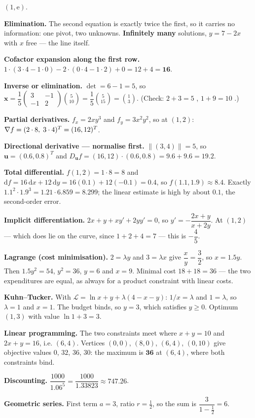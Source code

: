 \begin{solutions}
        $(1,\mathrm{e})$.
  \item \textbf{Elimination.} The second equation is exactly twice the
        first, so it carries no information: one pivot, two unknowns.
        \textbf{Infinitely many} solutions, $y=7-2x$ with $x$ free ---
        the line itself.
  \item \textbf{Cofactor expansion along the first row.}
        $1\cdot(3\cdot4-1\cdot0)-2\cdot(0\cdot4-1\cdot2)+0
        =12+4=\mathbf{16}$.
  \item \textbf{Inverse or elimination.} $\det=6-1=5$, so
        $\mathbf{x}=\dfrac15\begin{pmatrix}3&-1\\-1&2\end{pmatrix}
        \binom{5}{10}=\dfrac15\binom{5}{15}=\binom{1}{3}$.
        (Check: $2+3=5$ \checkmark, $1+9=10$ \checkmark.)
  \item \textbf{Partial derivatives.} $f_{x}=2xy^{3}$ and
        $f_{y}=3x^{2}y^{2}$, so at $(1,2)$:
        $\nabla f=(2\cdot8,\;3\cdot4)^{T}=(16,12)^{T}$.
  \item \textbf{Directional derivative --- normalise first.}
        $\|(3,4)\|=5$, so $\mathbf{u}=(0.6,0.8)^{T}$ and
        $D_{\mathbf{u}}f=(16,12)\cdot(0.6,0.8)=9.6+9.6=\mathbf{19.2}$.
  \item \textbf{Total differential.} $f(1,2)=1\cdot8=8$ and
        $\mathrm{d}f=16\,\mathrm{d}x+12\,\mathrm{d}y
        =16(0.1)+12(-0.1)=0.4$, so $f(1.1,1.9)\approx8.4$. Exactly
        $1.1^{2}\cdot1.9^{3}=1.21\cdot6.859=8.299$; the linear estimate is
        high by about $0.1$, the second-order error.
  \item \textbf{Implicit differentiation.} $2x+y+xy'+2yy'=0$, so
        $y'=-\dfrac{2x+y}{x+2y}$. At $(1,2)$ --- which does lie on the
        curve, since $1+2+4=7$ --- this is
        $-\dfrac{4}{5}$.
  \item \textbf{Lagrange (cost minimisation).}
        $2=\lambda y$ and $3=\lambda x$ give $\dfrac{x}{y}=\dfrac32$, so
        $x=1.5y$. Then $1.5y^{2}=54$, $y^{2}=36$, $y=6$ and $x=9$. Minimal
        cost $18+18=36$ --- the two expenditures are equal, as always for
        a product constraint with linear costs.
  \item \textbf{Kuhn--Tucker.} With
        $\mathcal{L}=\ln x+y+\lambda(4-x-y)$: $1/x=\lambda$ and
        $1=\lambda$, so $\lambda=1$ and $x=1$. The budget binds, so $y=3$,
        which satisfies $y\ge0$. Optimum $(1,3)$ with value
        $\ln1+3=3$.
  \item \textbf{Linear programming.} The two constraints meet where
        $x+y=10$ and $2x+y=16$, i.e. $(6,4)$. Vertices $(0,0)$, $(8,0)$,
        $(6,4)$, $(0,10)$ give objective values $0$, $32$, $36$, $30$: the
        maximum is $\mathbf{36}$ at $(6,4)$, where both constraints bind.
  \item \textbf{Discounting.}
        $\dfrac{1000}{1.06^{5}}=\dfrac{1000}{1.33823}\approx747.26$.
  \item \textbf{Geometric series.} First term $a=3$, ratio
        $r=\tfrac12$, so the sum is $\dfrac{3}{1-\tfrac12}=6$.
\end{solutions}
